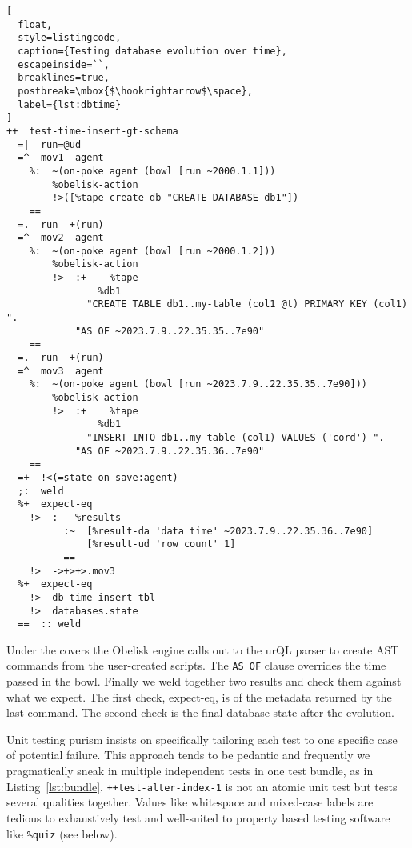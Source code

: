 \documentclass[twoside]{article}
\begin{document}
\begin{lstlisting}[
  float,
  style=listingcode,
  caption={Testing database evolution over time},
  escapeinside=``,
  breaklines=true,
  postbreak=\mbox{$\hookrightarrow$\space},
  label={lst:dbtime}
]
++  test-time-insert-gt-schema
  =|  run=@ud
  =^  mov1  agent  
    %:  ~(on-poke agent (bowl [run ~2000.1.1]))
        %obelisk-action
        !>([%tape-create-db "CREATE DATABASE db1"])
    ==
  =.  run  +(run)
  =^  mov2  agent  
    %:  ~(on-poke agent (bowl [run ~2000.1.2]))
        %obelisk-action
        !>  :+    %tape
                %db1
              "CREATE TABLE db1..my-table (col1 @t) PRIMARY KEY (col1) ".
            "AS OF ~2023.7.9..22.35.35..7e90"
    ==
  =.  run  +(run)
  =^  mov3  agent  
    %:  ~(on-poke agent (bowl [run ~2023.7.9..22.35.35..7e90]))
        %obelisk-action
        !>  :+    %tape 
                %db1 
              "INSERT INTO db1..my-table (col1) VALUES ('cord') ".
            "AS OF ~2023.7.9..22.35.36..7e90"
    ==
  =+  !<(=state on-save:agent)
  ;:  weld
  %+  expect-eq
    !>  :-  %results
          :~  [%result-da 'data time' ~2023.7.9..22.35.36..7e90]
              [%result-ud 'row count' 1]
          ==
    !>  ->+>+>.mov3
  %+  expect-eq
    !>  db-time-insert-tbl
    !>  databases.state
  ==  :: weld
\end{lstlisting}

Under the covers the Obelisk engine calls out to the urQL parser to create AST commands from the user-created scripts. The \texttt{AS OF} clause overrides the time passed in the bowl. Finally we weld together two results and check them against what we expect. The first check, expect-eq, is of the metadata returned by the last command. The second check is the final database state after the evolution.

Unit testing purism insists on specifically tailoring each test to one specific case of potential failure. This approach tends to be pedantic and frequently we pragmatically sneak in multiple independent tests in one test bundle, as in Listing~\ref{lst:bundle}.  \texttt{++test-alter-index-1} is not an atomic unit test but tests several qualities together. Values like whitespace and mixed-case labels are tedious to exhaustively test and well-suited to property based testing software like \texttt{\%quiz} (see below).
\end{document}

